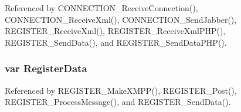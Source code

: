 Referenced by CONNECTION\_\-ReceiveConnection(), CONNECTION\_\-ReceiveXml(), CONNECTION\_\-SendJabber(), REGISTER\_\-ReceiveXml(), REGISTER\_\-ReceiveXmlPHP(), REGISTER\_\-SendData(), and REGISTER\_\-SendDataPHP().
\subsubsection[RegisterData]{\setlength{\rightskip}{0pt plus 5cm}var {\bf RegisterData}}\label{register_8js_4583a8d58cbb1b7308bdb36dc1ec5b56}




Referenced by REGISTER\_\-MakeXMPP(), REGISTER\_\-Post(), REGISTER\_\-ProcessMessage(), and REGISTER\_\-SendData().